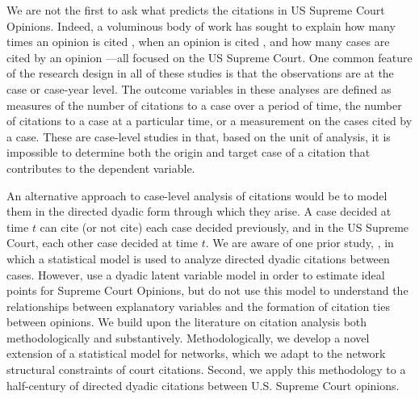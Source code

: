 \documentclass{cup-pan}
\begin{document}
We are not the first to ask what predicts the citations in US Supreme Court Opinions. Indeed, a voluminous body of work has sought to explain how many times an opinion is cited \citep[e.g.,][]{cross2010determinants,benjamin2012standing,fix2019effect}, when an opinion is cited \citep[e.g.,][]{black2013citation,spriggs2001explaining}, and how many cases are cited by an opinion \citep[e.g.,][]{lupu2013strategic}---all focused on the US Supreme Court. One common feature of the research design in all of these studies is that the observations are at the case or case-year level. The outcome variables in these analyses are defined as measures of the number of citations to a case over a period of time, the number of citations to a case at a particular time, or a measurement on the cases cited by a case. These are case-level studies in that, based on the unit of analysis, it is impossible to determine both the origin and target case of a citation that contributes to the dependent variable.

An alternative approach to case-level analysis of citations would be to model them in the directed dyadic form through which they arise. A case decided at time $t$ can cite (or not cite) each case decided previously, and in the US Supreme Court, each other case decided at time $t$. We are aware of one prior study, \citet{clark2010locating}, in which a statistical model is used to analyze directed dyadic citations between cases. However, \citet{clark2010locating} use a dyadic latent variable model in order to estimate ideal points for Supreme Court Opinions, but do not use this model to understand the relationships between explanatory variables and the formation of citation ties between opinions. We build upon the literature on citation analysis both methodologically and substantively. Methodologically, we develop a novel extension of a statistical model for networks, which we adapt to the network structural constraints of court citations. Second, we apply this methodology to a half-century of directed dyadic citations between U.S. Supreme Court opinions.
\end{document}
